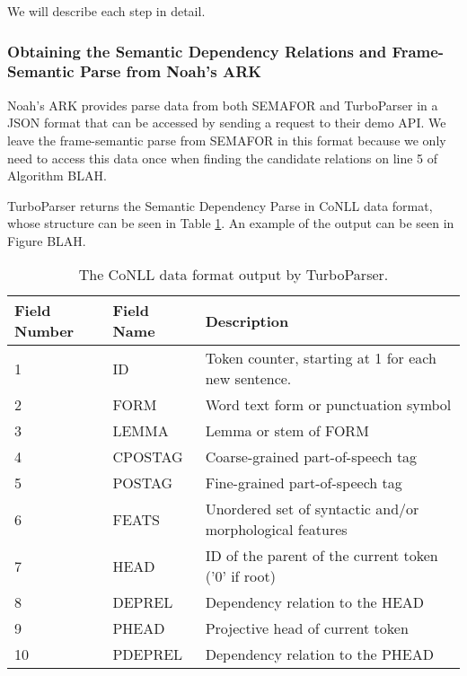 We will describe each step in detail.

\subsubsection{Obtaining the Semantic Dependency Relations and Frame-Semantic Parse from Noah's ARK}

Noah's ARK provides parse data from both SEMAFOR and TurboParser in a JSON format that can be accessed by sending a request to their demo API. We leave the frame-semantic parse from SEMAFOR in this format because we only need to access this data once when finding the candidate relations on line 5 of Algorithm BLAH.

TurboParser returns the Semantic Dependency Parse in CoNLL data format, whose structure can be seen in Table \ref{tab:CoNLL}. An example of the output can be seen in Figure BLAH.

\begin{table}
\centering
    \begin{tabular}{|l|l|l|}
    \hline
    Field Number & Field Name & Description                                                \\ \hline
    1            & ID         & Token counter, starting at 1 for each new sentence.        \\
    2            & FORM       & Word text form or punctuation symbol                       \\
    3            & LEMMA      & Lemma or stem of FORM                                      \\
    4            & CPOSTAG    & Coarse-grained part-of-speech tag                          \\
    5            & POSTAG     & Fine-grained part-of-speech tag                            \\
    6            & FEATS      & Unordered set of syntactic and/or morphological features   \\
    7            & HEAD       & ID of the parent of the current token ('0' if root)        \\
    8            & DEPREL     & Dependency relation to the HEAD                            \\
    9            & PHEAD      & Projective head of current token                           \\
    10           & PDEPREL    & Dependency relation to the PHEAD                           \\ \hline
    \end{tabular}
\caption{The CoNLL data format output by TurboParser.}
\label{tab:CoNLL}
\end{table}


